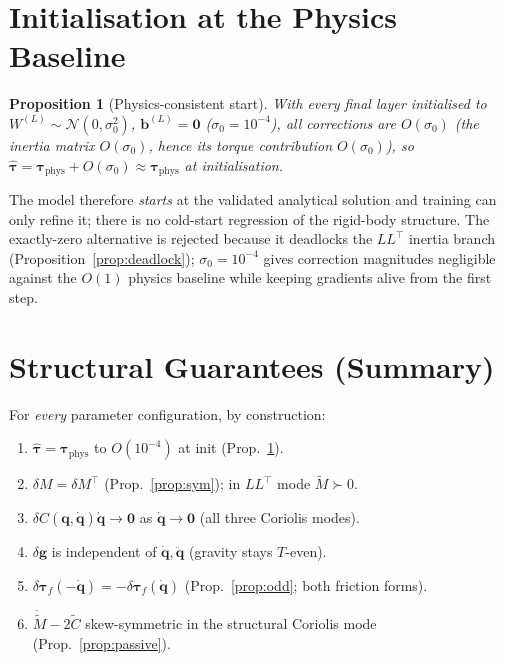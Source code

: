\documentclass[11pt]{article}
\newcommand{\q}{\bm{q}}
\newcommand{\qd}{\dot{\bm{q}}}
\newcommand{\qdd}{\ddot{\bm{q}}}
\newcommand{\tphys}{\bm{\tau}_{\mathrm{phys}}}
\newcommand{\that}{\hat{\bm{\tau}}}
\newcommand{\dg}{\delta\bm{g}}
\newcommand{\dM}{\delta\!M}
\newcommand{\dC}{\delta C}
\newcommand{\dtf}{\delta\bm{\tau}_f}
\newcommand{\Mt}{\tilde{M}}
\newcommand{\Ct}{\tilde{C}}
\newcommand{\transp}{^{\top}}
\theoremstyle{definition}
\theoremstyle{plain}
\newtheorem{proposition}{Proposition}
\begin{document}
\section{Initialisation at the Physics Baseline}
\label{sec:init}
\begin{proposition}[Physics-consistent start]\label{prop:init}
With every final layer initialised to $W^{(L)}\!\sim\!\mathcal N(0,\sigma_0^2)$,
$\bm b^{(L)}=\bm 0$ ($\sigma_0=10^{-4}$), all corrections are $O(\sigma_0)$ (the
inertia matrix $O(\sigma_0)$, hence its torque contribution $O(\sigma_0)$), so
$\that=\tphys+O(\sigma_0)\approx\tphys$ at initialisation.
\end{proposition}
The model therefore \emph{starts} at the validated analytical solution and
training can only refine it; there is no cold-start regression of the rigid-body
structure. The exactly-zero alternative is rejected because it deadlocks the
$LL\transp$ inertia branch (Proposition~\ref{prop:deadlock}); $\sigma_0=10^{-4}$
gives correction magnitudes negligible against the $O(1)$ physics baseline while
keeping gradients alive from the first step.

\section{Structural Guarantees (Summary)}
For \emph{every} parameter configuration, by construction:
\begin{enumerate}[leftmargin=2em,itemsep=1pt]
  \item $\that=\tphys$ to $O(10^{-4})$ at init (Prop.~\ref{prop:init}).
  \item $\dM=\dM\transp$ (Prop.~\ref{prop:sym}); in $LL\transp$ mode $\Mt\succ0$.
  \item $\dC(\q,\qd)\qd\to\bm 0$ as $\qd\to\bm 0$ (all three Coriolis modes).
  \item $\dg$ is independent of $\qd,\qdd$ (gravity stays $T$-even).
  \item $\dtf(-\qd)=-\dtf(\qd)$ (Prop.~\ref{prop:odd}; both friction forms).
  \item $\dot{\Mt}-2\Ct$ skew-symmetric in the structural Coriolis mode
  (Prop.~\ref{prop:passive}).
\end{enumerate}

\end{document}
